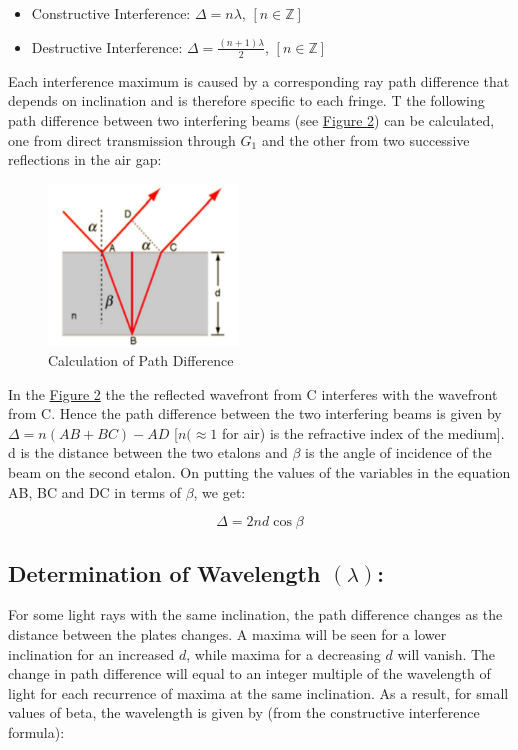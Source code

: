 		\begin{itemize}
			\item Constructive Interference: $\Delta = n\lambda$, $[n\in\mathbb{Z}]$
			\item Destructive Interference: $\Delta = \frac{(n+1)\lambda}{2}$, $[n\in\mathbb{Z}]$
		\end{itemize}

		Each interference maximum is caused by a corresponding ray path difference that depends on inclination and is therefore specific to each fringe. T the following path difference between two interfering beams (see \hyperref[fig:2]{Figure 2}) can be calculated, one from direct transmission through $G_1$ and the other from two successive reflections in the air gap:

		\begin{figure}[H]
			\centering
			\includegraphics[width=0.45\textwidth]{images/path_difference.png}
			\caption{Calculation of Path Difference}
			\label{fig:2}
		\end{figure}

		In the \hyperref[fig:2]{Figure 2} the the reflected wavefront from C interferes with the wavefront from C. Hence the path difference between the two interfering beams is given by $\Delta = n(AB + BC) - AD$ [$n(\approx 1$ for air) is the refractive index of the medium]. d is the distance between the two etalons and $\beta$ is the angle of incidence of the beam on the second etalon. On putting the values of the variables in the equation AB, BC and DC in terms of $\beta$, we get:

			$$\Delta = 2nd\cos\beta$$

	\subsection{Determination of Wavelength $(\lambda)$:}

		For some light rays with the same inclination, the path difference changes as the distance between the plates changes. A maxima will be seen for a lower inclination for an increased $d$, while maxima for a decreasing $d$ will vanish. The change in path difference will equal to an integer multiple of the wavelength of light for each recurrence of maxima at the same inclination. As a result, for small values of beta, the wavelength is given by (from the constructive interference formula):

